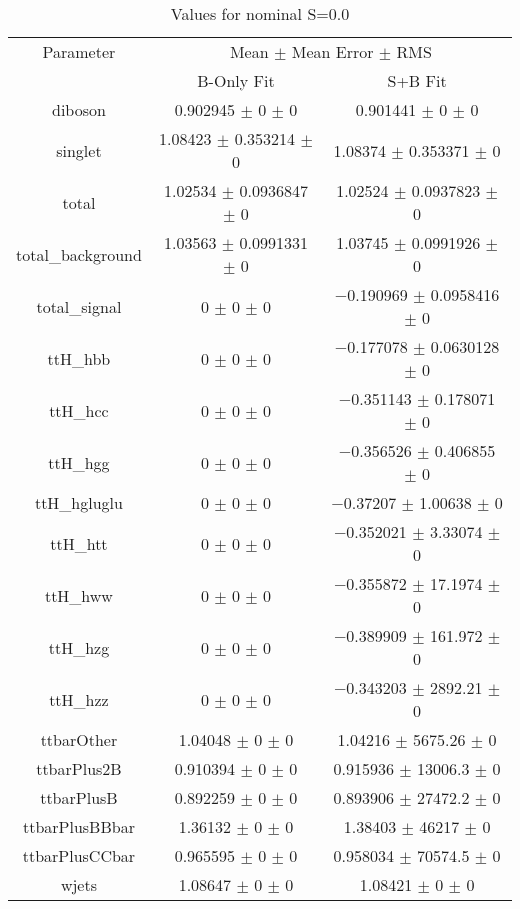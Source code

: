 \begin{table}
\centering
\caption{Values for nominal S=0.0}
\begin{tabular}{ccc}
\toprule
Parameter & \multicolumn{2}{c}{Mean $\pm$ Mean Error $\pm$ RMS}\\
 & B-Only Fit & S+B Fit\\
\midrule
diboson & \num{0.902945} $\pm$ \num{0} $\pm$ \num{0} & \num{0.901441} $\pm$ \num{0} $\pm$ \num{0}\\
singlet & \num{1.08423} $\pm$ \num{0.353214} $\pm$ \num{0} & \num{1.08374} $\pm$ \num{0.353371} $\pm$ \num{0}\\
total & \num{1.02534} $\pm$ \num{0.0936847} $\pm$ \num{0} & \num{1.02524} $\pm$ \num{0.0937823} $\pm$ \num{0}\\
total\_background & \num{1.03563} $\pm$ \num{0.0991331} $\pm$ \num{0} & \num{1.03745} $\pm$ \num{0.0991926} $\pm$ \num{0}\\
total\_signal & \num{0} $\pm$ \num{0} $\pm$ \num{0} & \num{-0.190969} $\pm$ \num{0.0958416} $\pm$ \num{0}\\
ttH\_hbb & \num{0} $\pm$ \num{0} $\pm$ \num{0} & \num{-0.177078} $\pm$ \num{0.0630128} $\pm$ \num{0}\\
ttH\_hcc & \num{0} $\pm$ \num{0} $\pm$ \num{0} & \num{-0.351143} $\pm$ \num{0.178071} $\pm$ \num{0}\\
ttH\_hgg & \num{0} $\pm$ \num{0} $\pm$ \num{0} & \num{-0.356526} $\pm$ \num{0.406855} $\pm$ \num{0}\\
ttH\_hgluglu & \num{0} $\pm$ \num{0} $\pm$ \num{0} & \num{-0.37207} $\pm$ \num{1.00638} $\pm$ \num{0}\\
ttH\_htt & \num{0} $\pm$ \num{0} $\pm$ \num{0} & \num{-0.352021} $\pm$ \num{3.33074} $\pm$ \num{0}\\
ttH\_hww & \num{0} $\pm$ \num{0} $\pm$ \num{0} & \num{-0.355872} $\pm$ \num{17.1974} $\pm$ \num{0}\\
ttH\_hzg & \num{0} $\pm$ \num{0} $\pm$ \num{0} & \num{-0.389909} $\pm$ \num{161.972} $\pm$ \num{0}\\
ttH\_hzz & \num{0} $\pm$ \num{0} $\pm$ \num{0} & \num{-0.343203} $\pm$ \num{2892.21} $\pm$ \num{0}\\
ttbarOther & \num{1.04048} $\pm$ \num{0} $\pm$ \num{0} & \num{1.04216} $\pm$ \num{5675.26} $\pm$ \num{0}\\
ttbarPlus2B & \num{0.910394} $\pm$ \num{0} $\pm$ \num{0} & \num{0.915936} $\pm$ \num{13006.3} $\pm$ \num{0}\\
ttbarPlusB & \num{0.892259} $\pm$ \num{0} $\pm$ \num{0} & \num{0.893906} $\pm$ \num{27472.2} $\pm$ \num{0}\\
ttbarPlusBBbar & \num{1.36132} $\pm$ \num{0} $\pm$ \num{0} & \num{1.38403} $\pm$ \num{46217} $\pm$ \num{0}\\
ttbarPlusCCbar & \num{0.965595} $\pm$ \num{0} $\pm$ \num{0} & \num{0.958034} $\pm$ \num{70574.5} $\pm$ \num{0}\\
wjets & \num{1.08647} $\pm$ \num{0} $\pm$ \num{0} & \num{1.08421} $\pm$ \num{0} $\pm$ \num{0}\\
\bottomrule
\end{tabular}
\end{table}